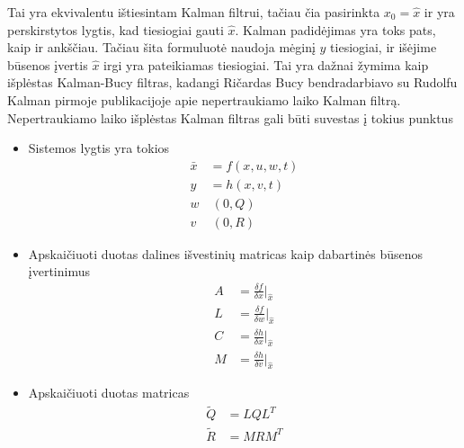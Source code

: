 \documentclass[12pt, a4paper, lithuanian]{article}
\begin{document}
            Tai yra ekvivalentu ištiesintam Kalman filtrui, tačiau čia pasirinkta $x_0 = \hat{x}$ ir yra perskirstytos lygtis, kad tiesiogiai gauti $\hat{x}$.
            Kalman padidėjimas yra toks pats, kaip ir ankščiau.
            Tačiau šita formuluotė naudoja mėginį $y$ tiesiogiai, ir išėjime būsenos įvertis $\hat{x}$ irgi yra pateikiamas tiesiogiai.
            Tai yra dažnai žymima kaip išplėstas Kalman-Bucy filtras, kadangi Ričardas Bucy bendradarbiavo su Rudolfu Kalman pirmoje publikacijoje apie nepertraukiamo laiko Kalman filtrą.
            Nepertraukiamo laiko išplėstas Kalman filtras gali būti suvestas į tokius punktus

            \begin{itemize}
                \item Sistemos lygtis yra tokios
                \begin{equation}
                    \begin{aligned}
                    \bar{x} &= f(x, u, w, t) \\
                    y &= h(x, v, t) \\
                    w &~ (0,Q) \\
                    v &~ (0, R)
                    \end{aligned}
                \end{equation}
                \item Apskaičiuoti duotas dalines išvestinių matricas kaip dabartinės būsenos įvertinimus
                \begin{equation}
                    \begin{aligned}
                        A &= \frac{\delta f}{\delta x}\Bigr|_{\hat{x}} \\
                        L &= \frac{\delta f}{\delta w}\Bigr|_{\hat{x}} \\
                        C &= \frac{\delta h}{\delta x}\Bigr|_{\hat{x}} \\
                        M &= \frac{\delta h}{\delta v}\Bigr|_{\hat{x}}
                    \end{aligned}
                \end{equation}
                \item Apskaičiuoti duotas matricas
                \begin{equation}
                    \begin{aligned}
                        \tilde{Q} &= LQL^T \\
                        \tilde{R} &= MRM^T

\end{aligned}
\end{equation}
\end{itemize}
\end{document}
